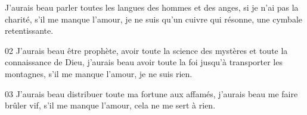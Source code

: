 J’aurais beau parler toutes les langues des hommes et des anges, si je n’ai pas la charité, s’il me manque l’amour, je ne suis qu’un cuivre qui résonne, une cymbale retentissante.

02 J’aurais beau être prophète, avoir toute la science des mystères et toute la connaissance de Dieu, j’aurais beau avoir toute la foi jusqu’à transporter les montagnes, s’il me manque l’amour, je ne suis rien.

03 J’aurais beau distribuer toute ma fortune aux affamés, j’aurais beau me faire brûler vif, s’il me manque l’amour, cela ne me sert à rien.
